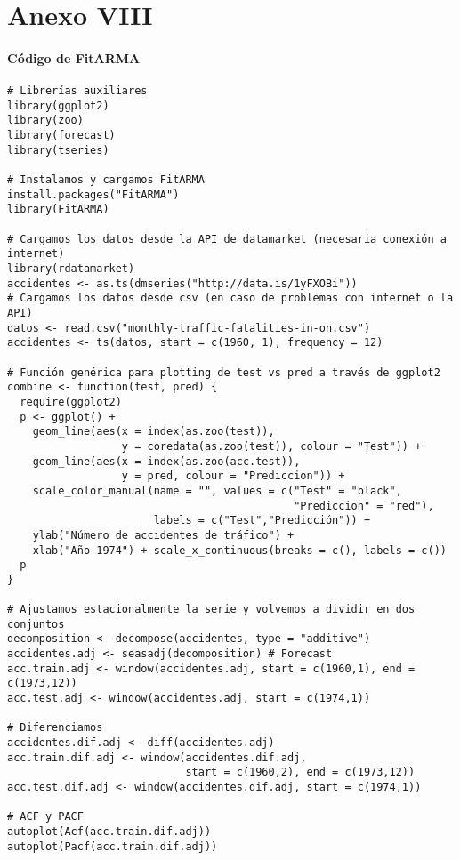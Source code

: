 \documentclass[12pt,a4paper,oneside]{article}
\begin{document}
\part*{Anexo VIII}

\subsection*{Código de FitARMA}

\begin{Verbatim}[fontsize=\footnotesize]
# Librerías auxiliares
library(ggplot2)
library(zoo)
library(forecast)
library(tseries)

# Instalamos y cargamos FitARMA
install.packages("FitARMA")
library(FitARMA)

# Cargamos los datos desde la API de datamarket (necesaria conexión a internet)
library(rdatamarket)
accidentes <- as.ts(dmseries("http://data.is/1yFXOBi"))
# Cargamos los datos desde csv (en caso de problemas con internet o la API)
datos <- read.csv("monthly-traffic-fatalities-in-on.csv")
accidentes <- ts(datos, start = c(1960, 1), frequency = 12)

# Función genérica para plotting de test vs pred a través de ggplot2
combine <- function(test, pred) {
  require(ggplot2)
  p <- ggplot() +
    geom_line(aes(x = index(as.zoo(test)),
                  y = coredata(as.zoo(test)), colour = "Test")) +
    geom_line(aes(x = index(as.zoo(acc.test)),
                  y = pred, colour = "Prediccion")) +
    scale_color_manual(name = "", values = c("Test" = "black",
                                             "Prediccion" = "red"),
                       labels = c("Test","Predicción")) +
    ylab("Número de accidentes de tráfico") +
    xlab("Año 1974") + scale_x_continuous(breaks = c(), labels = c())
  p
}

# Ajustamos estacionalmente la serie y volvemos a dividir en dos conjuntos
decomposition <- decompose(accidentes, type = "additive")
accidentes.adj <- seasadj(decomposition) # Forecast
acc.train.adj <- window(accidentes.adj, start = c(1960,1), end = c(1973,12))
acc.test.adj <- window(accidentes.adj, start = c(1974,1))

# Diferenciamos
accidentes.dif.adj <- diff(accidentes.adj)
acc.train.dif.adj <- window(accidentes.dif.adj,
                            start = c(1960,2), end = c(1973,12))
acc.test.dif.adj <- window(accidentes.dif.adj, start = c(1974,1))

# ACF y PACF
autoplot(Acf(acc.train.dif.adj))
autoplot(Pacf(acc.train.dif.adj))


\end{Verbatim}
\end{document}
